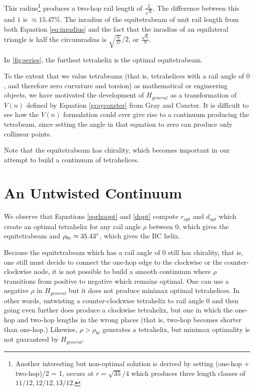 \documentclass[review]{siamonline1116}
\begin{document}
This radius\footnote{Another interesting but non-optimal solution is derived by setting
  (one-hop + two-hop)/2 = 1,
  occurs at $r = \sqrt{35}/4$ which produces
  three length classes of $11/12, 12/12, 13/12$.}
produces a two-hop rail length of $\frac{2}{\sqrt{3}}$.
The difference between this and $1$ is $\approx 15.47\% $. The inradius of the equitetrabeam of unit
rail length from both Equation \eqref{eq:inradius} and the fact that the inradius of
an equilateral triangle is half the circumradius is $\sqrt{\frac{8}{27}}/2$, or $\frac{\sqrt{6}}{9}$.


In \cref{fig:series}, the furthest tetrahelix is the optimal equitetrabeam.

To the extent that we value tetrabeams (that is, tetrahelices with a rail angle of $0$,
and therefore zero curvature and torsion) as mathematical or engineering objects,
we have motivated the development of $H_{general}$ as a transformation of $V(n)$ defined by
Equation \eqref{graycoxeter} from Gray and Coxeter. It is difficult to see how
the $V(n)$ 
formulation could ever give rise to a continuum producing the tetrabeam,
since setting the angle in that equation to zero can produce only collinear points.

Note that the equitetrabeam has chirality, which becomes important in our attempt to build a
continuum of tetrahelices.

\section{An Untwisted Continuum}


We observe that Equations \eqref{eqrhoopt} and \eqref{dopt} compute $r_{opt}$ and $d_{opt}$ which
create an optimal tetrahelix for any rail angle $\rho$ between $0$, which
gives the equitetrabeam and
$\rho_{bc} \approx 35.43 \degree$, which gives the BC helix.

 Because the equitetrabeam which has a rail angle of $0$ still has
 chirality, that is, one still must decide to connect the one-hop edge to
 the clockwise or the counter-clockwise node, it is not possible to build
 a smooth continuum where $\rho$ transitions from positive to negative
 which remains optimal. One can use a negative $\rho$ in $H_{general}$
 but it does not produce minimax optimal tetrahelices. In other words,
 untwisting a counter-clockwise tetrahelix to rail angle $0$ and then going
even further does produce a clockwise tetrahelix, but one in which the
 one-hop and two-hop lengths in the wrong places (that is, two-hop
 becomes shorter than one-hop.) Likewise, $\rho > \rho_{bc}$ generates
 a tetrahelix, but minimax optimality is not guaranteed by $H_{general}$.
 
\end{document}
